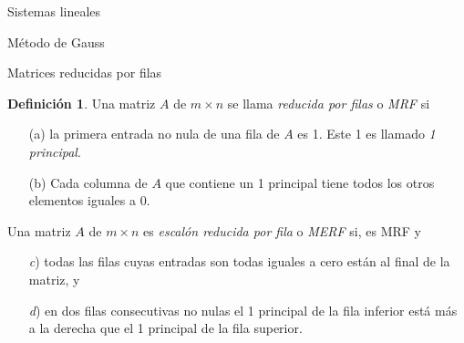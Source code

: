 \documentclass[a4paper,12pt,twoside,spanish,reqno]{amsbook}
\numberwithin{equation}{section}
\theoremstyle{definition}
\newtheorem{definicion}[teorema]{Definici\'on}
\theoremstyle{remark}
\begin{document}
\begin{chapter}{Sistemas lineales}
\begin{section}{Método de Gauss }
\begin{subsection}{Matrices reducidas por filas}
                \begin{definicion}
                    Una matriz $A$ de $m \times n$ se llama \textit{reducida por filas} o \textit{MRF} si 
                    \begin{enumerate}
                        \item[(a)] la primera entrada no nula de una fila de $A$ es 1. Este 1 es llamado \textit{1 principal}.
                        \item[(b)] Cada columna de $A$ que contiene un  1 principal tiene todos los otros elementos iguales a 0. 
                    \end{enumerate} 
                Una matriz $A$ de $m \times n$ es \textit{escalón reducida por fila} o \textit{MERF} si,  es  MRF y
                \begin{enumerate}
                    \item[\textit{c})] todas las filas cuyas entradas son todas iguales a cero están al final de la matriz, y
                    \item[\textit{d})] en dos filas consecutivas no nulas el 1 principal de la fila inferior está más a la derecha que el 1 principal de la fila superior. 
                \end{enumerate}
                
                \end{definicion} 
                

\end{subsection}
\end{section}
\end{chapter}
\end{document}
